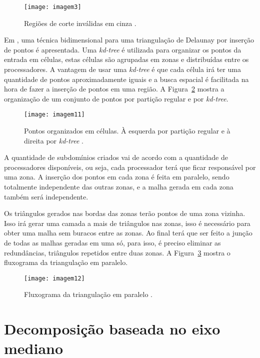  \begin{figure}[htbp]
     \centering
     \texttt{[image: imagem3]}
     \caption{Regiões de corte inválidas em cinza \cite{bib:Larwood03}.}
     \label{fig:imagem3}
 \end{figure}

 
 Em \cite{bib:Lo12}, uma técnica bidimensional para uma triangulação de Delaunay por inserção de pontos é apresentada. Uma \textit{kd-tree} é utilizada para organizar os pontos da entrada em células, estas células são agrupadas em zonas e distribuídas entre os processadores. A vantagem de usar uma \textit{kd-tree} é que cada célula irá ter uma quantidade de pontos aproximadamente iguais e a busca espacial é facilitada na hora de fazer a inserção de pontos em uma região. A Figura~\ref{fig:imagem11} mostra a organização de um conjunto de pontos por partição regular e por \textit{kd-tree}.
 
  \begin{figure}[htbp]
     \centering
     \texttt{[image: imagem11]}
     \caption{Pontos organizados em células. À esquerda por partição regular e à direita por \textit{kd-tree} \cite{bib:Lo12}.}
     \label{fig:imagem11}
 \end{figure}
 
 A quantidade de subdomínios criados vai de acordo com a quantidade de processadores disponíveis, ou seja, cada processador terá que ficar responsável por uma zona. A inserção dos pontos em cada zona é feita em paralelo, sendo totalmente independente das outras zonas, e a malha gerada em cada zona também será independente.
 
 Os triângulos gerados nas bordas das zonas terão pontos de uma zona vizinha. Isso irá gerar uma camada a mais de triângulos nas zonas, isso é necessário para obter uma malha sem buracos entre as zonas. Ao final terá que ser feito a junção de todas as malhas geradas em uma só, para isso, é preciso eliminar as redundâncias, triângulos repetidos entre duas zonas. A Figura~\ref{fig:imagem12} mostra o fluxograma da triangulação em paralelo.
 
   \begin{figure}[htbp]
     \centering
     \texttt{[image: imagem12]}
     \caption{ Fluxograma da triangulação em paralelo \cite{bib:Lo12}.}
     \label{fig:imagem12}
 \end{figure}
 
 
\section{Decomposição baseada no eixo mediano}

